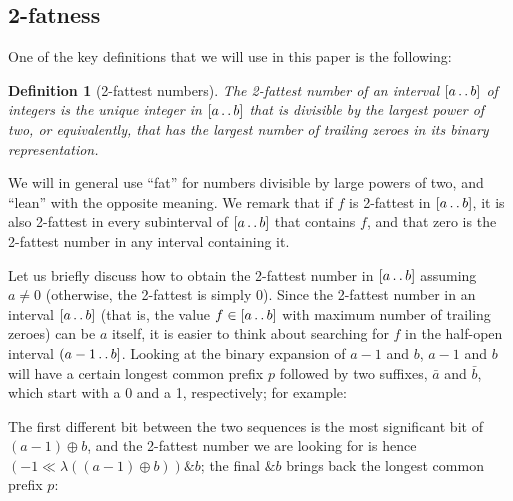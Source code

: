 \documentclass[a4paper]{article}
\newtheorem{definition}{Definition}
\newcommand{\?}{\mskip1.5mu}
\def\..{\,\mathpunct{\ldotp\ldotp}} %
\begin{document}
\subsection{2-fatness}

One of the key definitions that we will use in this paper is the following:

\begin{definition}[2-fattest numbers] 
\label{def:twofattest}
The \emph{2-fattest number} of an interval
$[a\..b]$ of integers is the unique integer in $[a\..b]$ that is
divisible by the largest power of two, or equivalently, that has the largest
number of trailing zeroes in its binary representation. 
\end{definition}

We will in general use ``fat'' for numbers
divisible by large powers of two, and ``lean'' with the opposite meaning. We
remark that if $f$ is 2-fattest in $[a\..b]$, it is also 2-fattest in every
subinterval of $[a\..b]$ that contains $f$, and that zero is the 2-fattest
number in any interval containing it.

Let us briefly discuss how to obtain the 2-fattest number in $[a\..b]$ assuming $a\neq 0$ (otherwise, the 2-fattest is simply 0).
Since the 2-fattest number in an interval $[a\..b]$ (that is, the value $f \in [a\..b]$
with maximum number of trailing zeroes) can be $a$ itself, it is easier to think about searching
for $f$ in the half-open interval $(a-1\..b]$. Looking at the binary expansion of $a-1$ and $b$,
$a-1$ and $b$  will have a certain longest common prefix $p$ followed by 
two suffixes, $\bar a$ and $\bar b$, which start with a 0 and a 1, respectively; for example:

\begin{center}
\end{center}
The first different bit between the two sequences is the most significant bit of
$(a-1) \oplus b$, and the 2-fattest number we are looking for is hence $(-1 \mathbin\ll \lambda((a-1) \oplus b)) \mathbin\& b$;
the final $\mathbin\& b$ brings back the longest common prefix $p$:
\begin{center}
\end{center}
\end{document}
